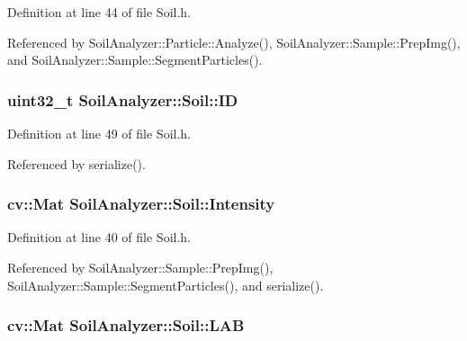 Definition at line 44 of file Soil.\+h.



Referenced by Soil\+Analyzer\+::\+Particle\+::\+Analyze(), Soil\+Analyzer\+::\+Sample\+::\+Prep\+Img(), and Soil\+Analyzer\+::\+Sample\+::\+Segment\+Particles().

\hypertarget{class_soil_analyzer_1_1_soil_a0011c3cd2a504e34c5962cbf72e397da}{}
\subsubsection[{I\+D}]{\setlength{\rightskip}{0pt plus 5cm}uint32\+\_\+t Soil\+Analyzer\+::\+Soil\+::\+I\+D}\label{class_soil_analyzer_1_1_soil_a0011c3cd2a504e34c5962cbf72e397da}


Definition at line 49 of file Soil.\+h.



Referenced by serialize().

\hypertarget{class_soil_analyzer_1_1_soil_a6f56200f2722df5b849d8cddd094c852}{}
\subsubsection[{Intensity}]{\setlength{\rightskip}{0pt plus 5cm}cv\+::\+Mat Soil\+Analyzer\+::\+Soil\+::\+Intensity}\label{class_soil_analyzer_1_1_soil_a6f56200f2722df5b849d8cddd094c852}


Definition at line 40 of file Soil.\+h.



Referenced by Soil\+Analyzer\+::\+Sample\+::\+Prep\+Img(), Soil\+Analyzer\+::\+Sample\+::\+Segment\+Particles(), and serialize().

\hypertarget{class_soil_analyzer_1_1_soil_a59ee773ff73380a12b1c2af3b86f6638}{}
\subsubsection[{L\+A\+B}]{\setlength{\rightskip}{0pt plus 5cm}cv\+::\+Mat Soil\+Analyzer\+::\+Soil\+::\+L\+A\+B}\label{class_soil_analyzer_1_1_soil_a59ee773ff73380a12b1c2af3b86f6638}


